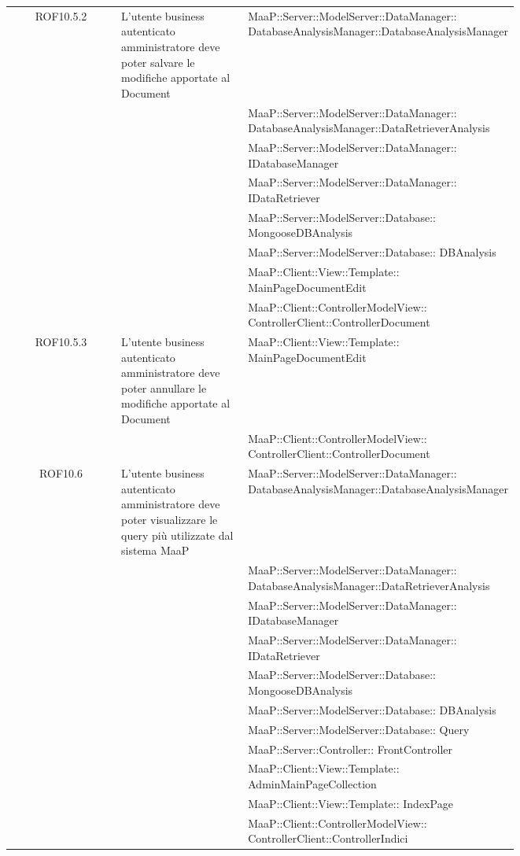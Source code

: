 \begin{center}
\begin{longtable}{|c|p{0.25\linewidth}|p{0.5\linewidth}|}
\midrule
ROF10.5.2
& L'utente business autenticato amministratore deve poter salvare le modifiche apportate al Document
& MaaP::Server::ModelServer::DataManager:: DatabaseAnalysisManager::DatabaseAnalysisManager\\
& & MaaP::Server::ModelServer::DataManager:: DatabaseAnalysisManager::DataRetrieverAnalysis\\
& & MaaP::Server::ModelServer::DataManager:: IDatabaseManager\\
& & MaaP::Server::ModelServer::DataManager:: IDataRetriever\\
& & MaaP::Server::ModelServer::Database:: MongooseDBAnalysis\\
& & MaaP::Server::ModelServer::Database:: DBAnalysis\\
& & MaaP::Client::View::Template:: MainPageDocumentEdit\\
& & MaaP::Client::ControllerModelView:: ControllerClient::ControllerDocument\\

\midrule
ROF10.5.3
& L'utente business autenticato amministratore deve poter annullare le modifiche apportate al Document
& MaaP::Client::View::Template:: MainPageDocumentEdit\\
& & MaaP::Client::ControllerModelView:: ControllerClient::ControllerDocument\\

\midrule
ROF10.6
& L'utente business autenticato amministratore deve poter visualizzare le query più utilizzate dal sistema MaaP
& MaaP::Server::ModelServer::DataManager:: DatabaseAnalysisManager::DatabaseAnalysisManager\\
& & MaaP::Server::ModelServer::DataManager:: DatabaseAnalysisManager::DataRetrieverAnalysis\\
& & MaaP::Server::ModelServer::DataManager:: IDatabaseManager\\
& & MaaP::Server::ModelServer::DataManager:: IDataRetriever\\
& & MaaP::Server::ModelServer::Database:: MongooseDBAnalysis\\
& & MaaP::Server::ModelServer::Database:: DBAnalysis\\
& & MaaP::Server::ModelServer::Database:: Query\\
& & MaaP::Server::Controller:: FrontController\\
& & MaaP::Client::View::Template:: AdminMainPageCollection\\
& & MaaP::Client::View::Template:: IndexPage\\
& & MaaP::Client::ControllerModelView:: ControllerClient::ControllerIndici\\


\end{longtable}
\end{center}
